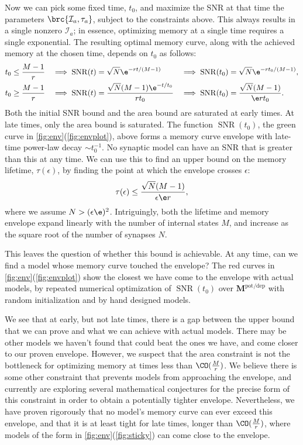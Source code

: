 \documentclass{article} %
\DeclareMathOperator{\SNR}{SNR}
\DeclareMathOperator{\snr}{SNR}
\newcommand{\inv}{^{-1}}
\newcommand{\M}{\mathbf{M}}
\newcommand{\potdep}{^{\text{pot/dep}}}
\newcommand{\CI}{\mathcal{I}}
\begin{document}
Now we can pick some fixed time, $t_0$, and maximize the SNR at that time \wrt the parameters $\brc{\CI_a,\tau_a}$, subject to the constraints above.
This always results in a single nonzero $\CI_a$; in essence, optimizing memory at a single time requires a single exponential.  The resulting optimal memory curve, along with the achieved memory at the chosen time, depends on $t_0$ as follows:
%
\begin{equation}\label{eq:env}
\begin{aligned}
  t_0 &\leq \frac{M-1}{r} &
   \implies
  \snr(t) &= \sqrt{N}\e^{-rt/(M-1)} &
   \implies
  \snr(t_0) &= \sqrt{N}\e^{-rt_0/(M-1)},\\
  t_0 &\geq \frac{M-1}{r} &
   \implies
  \snr(t) &= \frac{\sqrt{N}(M-1)\e^{-t/t_0}}{rt_0} &
   \implies
  \snr(t_0) &= \frac{\sqrt{N}(M-1)}{\e rt_0}.
\end{aligned}
\end{equation}
%
Both the initial SNR bound and the area bound are saturated at early times.
At late times, only the area bound is saturated.
The function $\snr(t_0)$, the green curve in \autoref{fig:env}(\ref{fig:envplot}), above forms a memory curve envelope with late-time power-law decay $\sim t_0\inv$.
No synaptic model can have an SNR that is greater than this at any time.
We can use this to find an upper bound on the memory lifetime, $\tau(\epsilon)$, by finding the point at which the envelope crosses $\epsilon$:
%
\begin{equation}\label{eq:lifebound}
  \tau(\epsilon) \leq \frac{\sqrt{N}(M-1)}{\epsilon\e r},
\end{equation}
%
where we assume $N>(\epsilon\e)^2$.
Intriguingly, both the lifetime and memory envelope expand linearly with the number of internal states $M$, and increase as the square root of the number of synapses $N$.

This leaves the question of whether this bound is achievable.
At any time, can we find a model whose memory curve touched the envelope?
The red curves in \autoref{fig:env}(\ref{fig:envplot}) show the closest we have come to the envelope with actual models, by repeated numerical optimization of $\SNR(t_0)$ over $\M\potdep$ with random initialization and by hand designed models.

We see that at early, but not late times, there is a gap between the upper bound that we can prove and what we can achieve with actual models.
There may be other models we haven't found that could beat the ones we have, and come closer to our proven envelope.
However, we suspect that the area constraint is not the bottleneck for optimizing memory at times less than  $\CO(\frac{M}{r})$.
We believe there is some other constraint that prevents models from approaching the envelope, and currently are exploring several mathematical conjectures for the precise form of this constraint in order to obtain a potentially tighter envelope.
Nevertheless, we have proven rigorously that no model's memory curve can ever exceed this envelope, and that it is at least tight for late times, longer than $\CO(\frac{M}{r})$, where models of the form in \autoref{fig:env}(\ref{fig:sticky})%
 can come close to the envelope.
\end{document}

